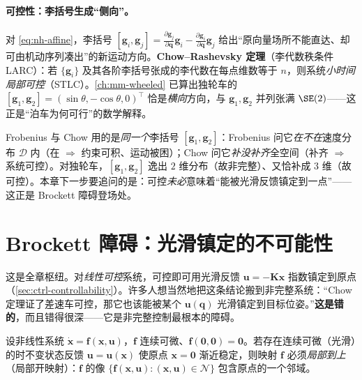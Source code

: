 \paragraph{可控性：李括号生成“侧向”。}
对 \cref{eq:nh-affine}，李括号 $[\mathbf{g}_i,\mathbf{g}_j]=\frac{\partial\mathbf{g}_j}{\partial\mathbf{q}}\mathbf{g}_i-\frac{\partial\mathbf{g}_i}{\partial\mathbf{q}}\mathbf{g}_j$ 给出“原向量场所不能直达、却可由机动序列凑出”的新运动方向。\textbf{Chow--Rashevsky 定理}（李代数秩条件 LARC）：若 $\{\mathbf{g}_i\}$ 及其各阶李括号张成的李代数在每点维数等于 $n$，则系统\emph{小时间局部可控}（STLC）。\cref{ch:mm-wheeled} 已算出独轮车的 $[\mathbf{g}_1,\mathbf{g}_2]=(\sin\theta,-\cos\theta,0)^\top$ 恰是\emph{横向}方向，与 $\mathbf{g}_1,\mathbf{g}_2$ 并列张满 $\SE(2)$——这正是“泊车为何可行”的数学解释。

\begin{insight}\label{ins:nh-twoface}
Frobenius 与 Chow 用的是\emph{同一个}李括号 $[\mathbf{g}_1,\mathbf{g}_2]$：Frobenius 问它\emph{在不在}速度分布 $\mathcal{D}$ 内（在 $\Rightarrow$ 约束可积、运动被困）；Chow 问它\emph{补没补齐}全空间（补齐 $\Rightarrow$ 系统可控）。对独轮车，$[\mathbf{g}_1,\mathbf{g}_2]$ 逸出 $2$ 维分布（故非完整）、又恰补成 $3$ 维（故可控）。本章下一步要追问的是：可控\emph{未必}意味着“能被光滑反馈镇定到一点”——这正是 Brockett 障碍登场处。
\end{insight}

\section{Brockett 障碍：光滑镇定的不可能性}
\label{sec:nh-brockett}

这是全章枢纽。对\emph{线性可控}系统，可控即可用光滑反馈 $\mathbf{u}=-\mathbf{K}\mathbf{x}$ 指数镇定到原点（\cref{sec:ctrl-controllability}）。许多人想当然地把这条结论搬到非完整系统：“Chow 定理证了差速车可控，那它也该能被某个 $\mathbf{u}(\mathbf{q})$ 光滑镇定到目标位姿。”\textbf{这是错的}，而且错得很深——它是非完整控制最根本的障碍。

\begin{theorem}\label{thm:nh-brockett}
设非线性系统 $\dot{\mathbf{x}}=\mathbf{f}(\mathbf{x},\mathbf{u})$，$\mathbf{f}$ 连续可微、$\mathbf{f}(\mathbf{0},\mathbf{0})=\mathbf{0}$。若存在连续可微（光滑）的时不变状态反馈 $\mathbf{u}=\mathbf{u}(\mathbf{x})$ 使原点 $\mathbf{x}=\mathbf{0}$ 渐近稳定，则映射 $\mathbf{f}$ 必须\emph{局部到上}（局部开映射）：$\mathbf{f}$ 的像 $\{\mathbf{f}(\mathbf{x},\mathbf{u}):(\mathbf{x},\mathbf{u})\in\mathcal{N}\}$ 包含原点的一个邻域。
\end{theorem}

